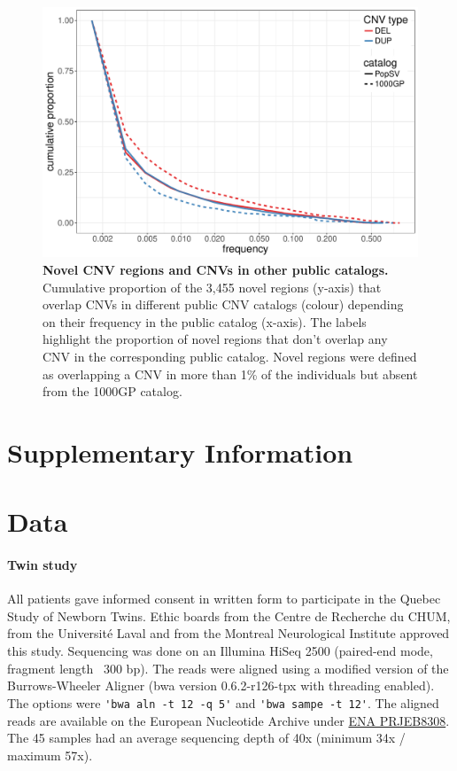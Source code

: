 \begin{figure}[htp]
  \centering
  \includegraphics[width=\textwidth,page=6]{figures/PopSV-catalog-overview.pdf}
  \caption[Novel CNV regions and CNVs in other public catalogs]{{\bf Novel CNV regions and CNVs in other public catalogs.} {\small Cumulative proportion of the 3,455 novel regions (y-axis) that overlap CNVs in different public CNV catalogs (colour) depending on their frequency in the public catalog (x-axis). The labels highlight the proportion of novel regions that don't overlap any CNV in the corresponding public catalog. Novel regions were defined as overlapping a CNV in more than 1\% of the individuals but absent from the 1000GP catalog.}}
  \label{fig:novelcatfreq}
\end{figure}





\clearpage

\section*{Supplementary Information}
\label{sec:suppmat:reppopsv}

\section*{Data}
\label{sec:data}

\paragraph{Twin study}
All patients gave informed consent in written form to participate in the Quebec Study of Newborn Twins\cite{Boivin2013}. Ethic boards from the Centre de Recherche du CHUM, from the Université Laval and from the Montreal Neurological Institute approved this study. Sequencing was done on an Illumina HiSeq 2500 (paired-end mode, fragment length ~300 bp). The reads were aligned using a modified version of the Burrows-Wheeler Aligner ({\sf bwa} version 0.6.2-r126-tpx with threading enabled). The options were \verb!'bwa aln -t 12 -q 5'! and \verb!'bwa sampe -t 12'!.
The aligned reads are available on the European Nucleotide Archive under \href{https://www.ebi.ac.uk/ena/data/view/PRJEB8308}{ENA PRJEB8308}.
The 45 samples had an average sequencing depth of 40x (minimum 34x / maximum 57x).

